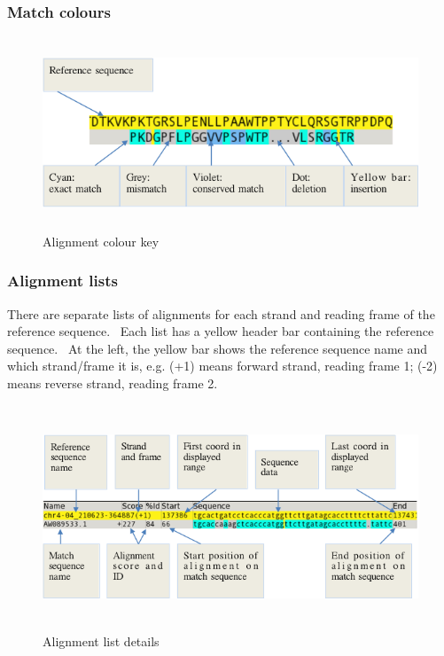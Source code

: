 \documentclass[letterpaper]{article}
\begin{document}
\bigskip

{\color[rgb]{0.30980393,0.5058824,0.7411765}\subsubsection[Match colours]{Match colours}}

\begin{figure}
\centering
\color[rgb]{0.30980393,0.5058824,0.7411765}
\includegraphics[width=14.353cm,height=5.74cm]{img_view_alignment_colour_key.png}
\caption{ Alignment colour key}
\end{figure}

{\color[rgb]{0.30980393,0.5058824,0.7411765}\subsubsection[Alignment lists]{Alignment lists}}
\hypertarget{RefHeading1701056909880}{}{
There are separate lists of alignments for each strand and reading frame
of the reference sequence. \ Each list has a yellow header bar
containing the reference sequence. \ At the left, the yellow bar shows
the reference sequence name and which strand/frame it is, e.g. (+1)
means forward strand, reading frame 1; (-2) means reverse strand,
reading frame 2.}

\begin{figure}
\centering
\color[rgb]{0.30980393,0.5058824,0.7411765}
\includegraphics[width=15.288cm,height=6.682cm]{img_view_alignment_details.png}
\caption{Alignment list details}
\end{figure}
\end{document}
